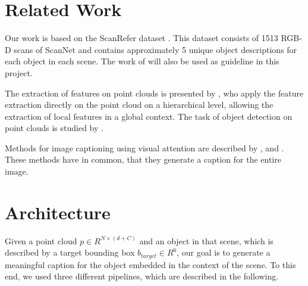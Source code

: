 \documentclass[10pt,twocolumn,letterpaper]{article}
\begin{document}
\section{Related Work}
Our work is based on the ScanRefer dataset \cite{chen2019scanrefer}. This dataset consists of 1513 RGB-D scans of ScanNet \cite{dai2017scannet} and contains approximately 5 unique object descriptions for each object in each scene. The work of \cite{chen2019scanrefer} will also be used as guideline in this project.

The extraction of features on point clouds is presented by \cite{qi2017pointnet++}, who apply the feature extraction directly on the point cloud on a hierarchical level, allowing the extraction of local features in a global context. 
The task of object detection on point clouds is studied by \cite{qi2019deep}. 

Methods for image captioning using visual attention are described by \cite{xu2015show}, \cite{lu2017knowing} and \cite{anderson2018bottom}.
These methods have in common, that they generate a caption for the entire image.

\section{Architecture}

Given a point cloud $\mathit{p \in R^{N\times(d+C)}}$ and an object in that scene, which is described by a target bounding box $b_{target}\in R^6$, our goal is to generate a meaningful caption for the object embedded in the context of the scene. To this end, we used three different pipelines, which are described in the following.
\end{document}
